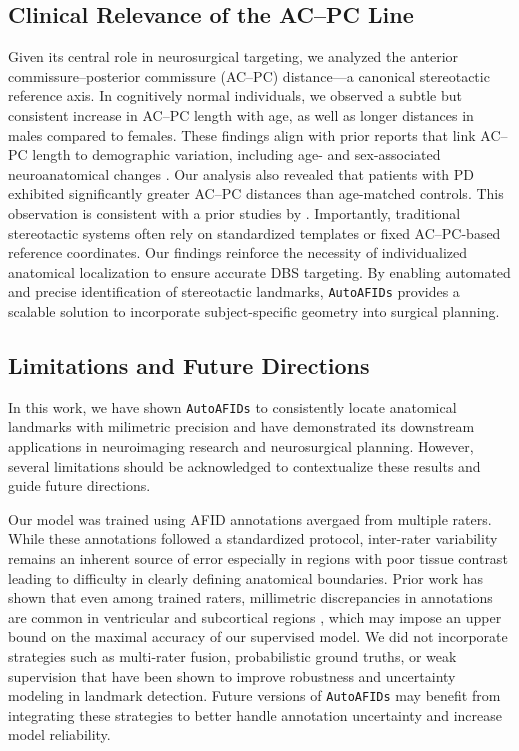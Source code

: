 \subsection{Clinical Relevance of the AC–PC Line}
Given its central role in neurosurgical targeting, we analyzed the anterior commissure–posterior commissure (AC–PC) distance---a canonical stereotactic reference axis. In cognitively normal individuals, we observed a subtle but consistent increase in AC–PC length with age, as well as longer distances in males compared to females. These findings align with prior reports that link AC–PC length to demographic variation, including age- and sex-associated neuroanatomical changes \cite{Lee2008-nd}. Our analysis also revealed that patients with PD exhibited significantly greater AC–PC distances than age-matched controls. This observation is consistent with a prior studies by \cite{Lee2008-nd,Dabadi2020-am}. Importantly, traditional stereotactic systems often rely on standardized templates or fixed AC–PC-based reference coordinates. Our findings reinforce the necessity of individualized anatomical localization to ensure accurate DBS targeting. By enabling automated and precise identification of stereotactic landmarks, \texttt{AutoAFIDs} provides a scalable solution to incorporate subject-specific geometry into surgical planning.

\subsection{Limitations and Future Directions}

In this work, we have shown \texttt{AutoAFIDs} to consistently locate anatomical landmarks with milimetric precision and have demonstrated its downstream applications in neuroimaging research and neurosurgical planning. However, several limitations should be acknowledged to contextualize these results and guide future directions.

Our model was trained using AFID annotations avergaed from multiple raters. While these annotations followed a standardized protocol, inter-rater variability remains an inherent source of error especially in regions with poor tissue contrast leading to difficulty in clearly defining anatomical boundaries. Prior work has shown that even among trained raters, millimetric discrepancies in annotations are common in ventricular and subcortical regions \cite{Lau2019-eh,Abbass2022-lf}, which may impose an upper bound on the maximal accuracy of our supervised model. We did not incorporate strategies such as multi-rater fusion, probabilistic ground truths, or weak supervision \cite{Salari2024-rw} that have been shown to improve robustness and uncertainty modeling in landmark detection. Future versions of \texttt{AutoAFIDs} may benefit from integrating these strategies to better handle annotation uncertainty and increase model reliability.

